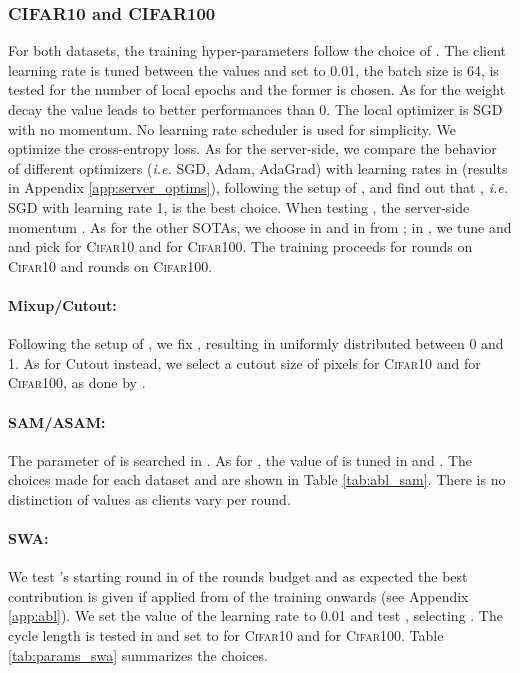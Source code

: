\subsubsection{CIFAR10 and CIFAR100} For both datasets, the training hyper-parameters follow the choice of \cite{hsu2020federated}. The client learning rate is tuned between the values  and set to 0.01, the batch size is 64,  is tested for the number of local epochs and the former is chosen. As for the weight decay the value  leads to better performances than 0. The local optimizer is SGD with no momentum. No learning rate scheduler is used for simplicity. We optimize the cross-entropy loss. As for the server-side, we compare the behavior of different optimizers (\textit{i.e.} SGD, Adam, AdaGrad) with learning rates in  (results in Appendix \ref{app:server_optims}), following the setup of \cite{reddi2020adaptive}, and find out that \fedavg, \textit{i.e.} SGD with learning rate 1, is the best choice. When testing \fedavgm, the server-side momentum . As for the other SOTAs, we choose  in \fedprox and  in \feddyn from ; in \adabest, we tune  and  and pick  for \textsc{Cifar10} and  for \textsc{Cifar100}. The training proceeds for  rounds on \textsc{Cifar10} and  rounds on \textsc{Cifar100}.

\paragraph{Mixup/Cutout:} Following the setup of \cite{zhang2017mixup}, we fix , resulting in  uniformly distributed between 0 and 1. As for Cutout instead, we select a cutout size of  pixels for \textsc{Cifar10} and  for \textsc{Cifar100}, as done by \cite{devries2017improved}.  

\paragraph{SAM/ASAM:} The parameter  of \sam is searched in . As for \asam, the value of  is tuned in  and . The choices made for each dataset and  are shown in Table \ref{tab:abl_sam}. There is no distinction of values as clients vary per round.

\paragraph{SWA:} We test \swa's starting round in  of the rounds budget and as expected \cite{izmailov2018averaging} the best contribution is given if applied from  of the training onwards (see Appendix \ref{app:abl}). We set the value of the learning rate  to 0.01 and test , selecting . The cycle length  is tested in  and set to  for \textsc{Cifar10} and  for \textsc{Cifar100}. Table \ref{tab:params_swa} summarizes the choices. 

